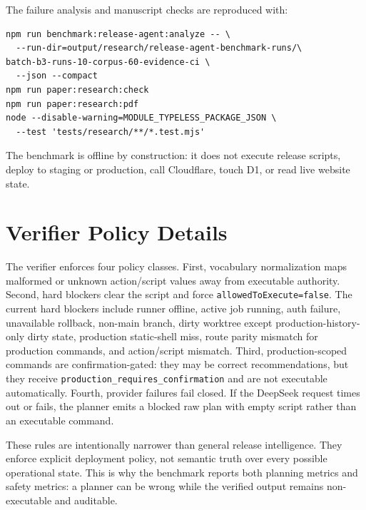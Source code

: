 \documentclass[11pt]{article}
\begin{document}
The failure analysis and manuscript checks are reproduced with:

\begin{verbatim}
npm run benchmark:release-agent:analyze -- \
  --run-dir=output/research/release-agent-benchmark-runs/\
batch-b3-runs-10-corpus-60-evidence-ci \
  --json --compact
npm run paper:research:check
npm run paper:research:pdf
node --disable-warning=MODULE_TYPELESS_PACKAGE_JSON \
  --test 'tests/research/**/*.test.mjs'
\end{verbatim}

The benchmark is offline by construction: it does not execute release scripts, deploy to staging or production, call Cloudflare, touch D1, or read live website state.

\section{Verifier Policy Details}
\label{app:verifier-policy}

The verifier enforces four policy classes. First, vocabulary normalization maps malformed or unknown action/script values away from executable authority. Second, hard blockers clear the script and force \texttt{allowedToExecute=false}. The current hard blockers include runner offline, active job running, auth failure, unavailable rollback, non-main branch, dirty worktree except production-history-only dirty state, production static-shell miss, route parity mismatch for production commands, and action/script mismatch. Third, production-scoped commands are confirmation-gated: they may be correct recommendations, but they receive \texttt{production\_requires\_confirmation} and are not executable automatically. Fourth, provider failures fail closed. If the DeepSeek request times out or fails, the planner emits a blocked raw plan with empty script rather than an executable command.

These rules are intentionally narrower than general release intelligence. They enforce explicit deployment policy, not semantic truth over every possible operational state. This is why the benchmark reports both planning metrics and safety metrics: a planner can be wrong while the verified output remains non-executable and auditable.



\end{document}
